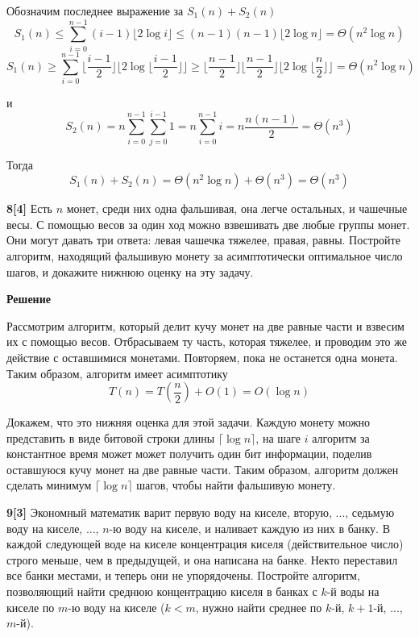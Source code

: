 \documentclass{article}
\begin{document}
Обозначим последнее выражение за $S_1(n) + S_2(n)$
\[
    S_1(n) \leq \sum_{i=0}^{n-1} (i - 1)
    \lfloor 2\log i \rfloor \leq
    (n-1)(n-1) \lfloor 2\log n \rfloor = \Theta(n^2 \log n)
\]
\[
    S_1(n) \geq \sum_{i=0}^{n-1} \lfloor \frac{i - 1}{2} \rfloor
    \lfloor 2\log \lfloor \frac{i - 1}{2} \rfloor \rfloor \geq
    \lfloor \frac{n-1}{2} \rfloor \lfloor \frac{n-1}{2} \rfloor
    \lfloor 2\log \lfloor \frac{n}{2} \rfloor \rfloor = \Theta(n^2 \log n)
\]

и
\[
    S_2(n) = n \sum_{i=0}^{n-1} \sum_{j=0}^{i-1} 1 =
    n \sum_{i=0}^{n-1} i = n\frac{n(n-1)}{2} = \Theta(n^3)
\]

Тогда
\[
    S_1(n) + S_2(n) = \Theta(n^2 \log n) + \Theta(n^3) = \Theta(n^3)
\]
\medskip

\textbf{8[4]} Есть $n$ монет, среди них одна фальшивая, она легче остальных, и чашечные весы. С помощью весов за один ход можно взвешивать две любые группы монет. Они могут давать три ответа: левая чашечка тяжелее, правая, равны. Постройте алгоритм, находящий фальшивую монету за асимптотически оптимальное число шагов, и докажите нижнюю оценку на эту задачу.

\medskip

\textbf{Решение}

Рассмотрим алгоритм, который делит кучу монет
на две равные части и взвесим их с помощью весов.
Отбрасываем ту часть, которая тяжелее, и проводим
это же действие с оставшимися монетами. Повторяем, пока
не останется одна монета. Таким образом, алгоритм имеет
асимптотику
\[
    T(n) = T(\frac{n}{2}) + O(1) = O(\log n)
\]

Докажем, что это нижняя оценка для этой задачи.
Каждую монету можно представить в виде битовой строки
длины $\lceil \log n \rceil$, на шаге $i$ алгоритм
за константное время может может получить один бит
информации, поделив оставшуюся кучу монет на две равные
части. Таким образом, алгоритм должен сделать минимум
$\lceil \log n \rceil$ шагов, чтобы найти фальшивую монету.

\medskip

\textbf{9[3]} Экономный математик варит первую воду на киселе, вторую, ..., седьмую воду на киселе, ..., $n$-ю воду на киселе, и наливает каждую из них в банку. В каждой следующей воде на киселе концентрация киселя (действительное число) строго меньше, чем в предыдущей, и она написана на банке. Некто переставил все банки местами, и теперь они не упорядочены. Постройте алгоритм, позволяющий найти среднюю концентрацию киселя в банках с $k$-й воды на киселе по $m$-ю воду на киселе ($k < m$, нужно найти среднее по $k$-й, $k+1$-й, ..., $m$-й).
\end{document}
